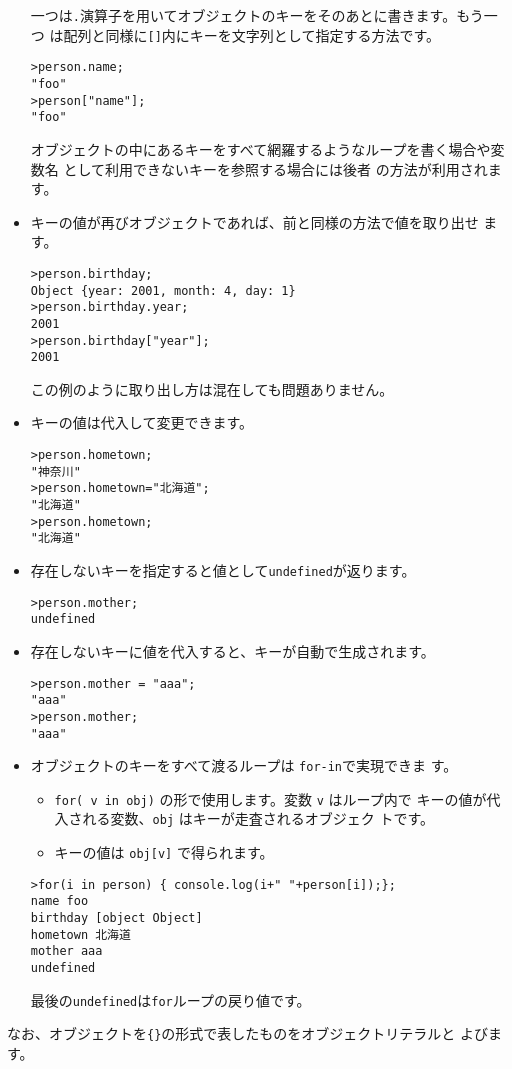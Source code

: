 \begin{itemize}
一つは\verb+.+演算子を用いてオブジェクトのキーをそのあとに書きます。もう一つ
       は配列と同様に\verb+[]+内にキーを文字列として指定する方法です。
\begin{Verbatim}
>person.name;
"foo"
>person["name"];
"foo"
\end{Verbatim}
オブジェクトの中にあるキーをすべて網羅するようなループを書く場合や変数名
       として利用できないキーを参照する場合には後者
       の方法が利用されます。
 \item キーの値が再びオブジェクトであれば、前と同様の方法で値を取り出せ
       ます。
\begin{Verbatim}
>person.birthday;
Object {year: 2001, month: 4, day: 1}
>person.birthday.year;
2001
>person.birthday["year"];
2001
\end{Verbatim}
この例のように取り出し方は混在しても問題ありません。
 \item キーの値は代入して変更できます。
\begin{Verbatim}
>person.hometown;
"神奈川"
>person.hometown="北海道";
"北海道"
>person.hometown;
"北海道"
\end{Verbatim}
 \item 存在しないキーを指定すると値として\verb+undefined+が返ります。
\begin{Verbatim}
>person.mother;
undefined
\end{Verbatim}
 \item 存在しないキーに値を代入すると、キーが自動で生成されます。
\begin{Verbatim}
>person.mother = "aaa";
"aaa"
>person.mother;
"aaa"
\end{Verbatim}
 \item オブジェクトのキーをすべて渡るループは \verb+for-in+で実現できま
			 す。
\begin{itemize}
 \item \verb+for( v in obj)+ の形で使用します。変数 \verb+v+ はループ内で
       キーの値が代入される変数、\verb+obj+ はキーが走査されるオブジェク
       トです。
 \item キーの値は \verb+obj[v]+ で得られます。
\end{itemize}
\begin{Verbatim}
>for(i in person) { console.log(i+" "+person[i]);};
name foo
birthday [object Object]
hometown 北海道
mother aaa
undefined
\end{Verbatim}
最後の\verb+undefined+は\verb+for+ループの戻り値です。
\end{itemize}

なお、オブジェクトを\verb+{}+の形式で表したものをオブジェクトリテラルと
よびます。
